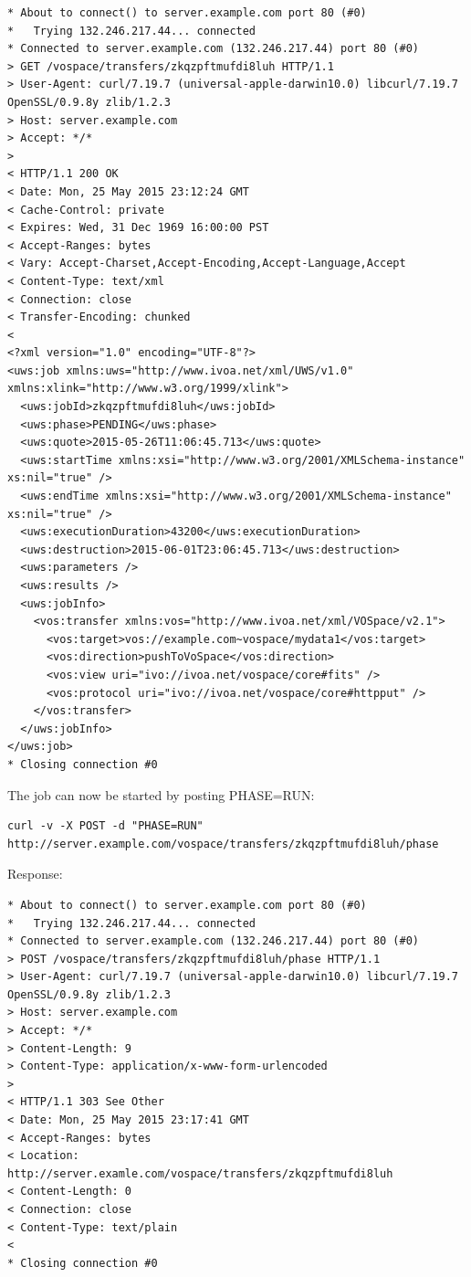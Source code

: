 \documentclass[11pt,a4paper]{ivoa}
\begin{document}
\begin{lstlisting}
* About to connect() to server.example.com port 80 (#0)
*   Trying 132.246.217.44... connected
* Connected to server.example.com (132.246.217.44) port 80 (#0)
> GET /vospace/transfers/zkqzpftmufdi8luh HTTP/1.1
> User-Agent: curl/7.19.7 (universal-apple-darwin10.0) libcurl/7.19.7 OpenSSL/0.9.8y zlib/1.2.3
> Host: server.example.com
> Accept: */*
>
< HTTP/1.1 200 OK
< Date: Mon, 25 May 2015 23:12:24 GMT
< Cache-Control: private
< Expires: Wed, 31 Dec 1969 16:00:00 PST
< Accept-Ranges: bytes
< Vary: Accept-Charset,Accept-Encoding,Accept-Language,Accept
< Content-Type: text/xml
< Connection: close
< Transfer-Encoding: chunked
<
<?xml version="1.0" encoding="UTF-8"?>
<uws:job xmlns:uws="http://www.ivoa.net/xml/UWS/v1.0" xmlns:xlink="http://www.w3.org/1999/xlink">
  <uws:jobId>zkqzpftmufdi8luh</uws:jobId>
  <uws:phase>PENDING</uws:phase>
  <uws:quote>2015-05-26T11:06:45.713</uws:quote>
  <uws:startTime xmlns:xsi="http://www.w3.org/2001/XMLSchema-instance" xs:nil="true" />
  <uws:endTime xmlns:xsi="http://www.w3.org/2001/XMLSchema-instance" xs:nil="true" />
  <uws:executionDuration>43200</uws:executionDuration>
  <uws:destruction>2015-06-01T23:06:45.713</uws:destruction>
  <uws:parameters />
  <uws:results />
  <uws:jobInfo>
    <vos:transfer xmlns:vos="http://www.ivoa.net/xml/VOSpace/v2.1">
      <vos:target>vos://example.com~vospace/mydata1</vos:target>
      <vos:direction>pushToVoSpace</vos:direction>
      <vos:view uri="ivo://ivoa.net/vospace/core#fits" />
      <vos:protocol uri="ivo://ivoa.net/vospace/core#httpput" />
    </vos:transfer>
  </uws:jobInfo>
</uws:job>
* Closing connection #0
\end{lstlisting}
The job can now be started by posting PHASE=RUN:
\begin{lstlisting}
curl -v -X POST -d "PHASE=RUN" http://server.example.com/vospace/transfers/zkqzpftmufdi8luh/phase
\end{lstlisting}
Response:
\begin{lstlisting}
* About to connect() to server.example.com port 80 (#0)
*   Trying 132.246.217.44... connected
* Connected to server.example.com (132.246.217.44) port 80 (#0)
> POST /vospace/transfers/zkqzpftmufdi8luh/phase HTTP/1.1
> User-Agent: curl/7.19.7 (universal-apple-darwin10.0) libcurl/7.19.7 OpenSSL/0.9.8y zlib/1.2.3
> Host: server.example.com
> Accept: */*
> Content-Length: 9
> Content-Type: application/x-www-form-urlencoded
>
< HTTP/1.1 303 See Other
< Date: Mon, 25 May 2015 23:17:41 GMT
< Accept-Ranges: bytes
< Location: http://server.examle.com/vospace/transfers/zkqzpftmufdi8luh
< Content-Length: 0
< Connection: close
< Content-Type: text/plain
<
* Closing connection #0
\end{lstlisting}
\end{document}
